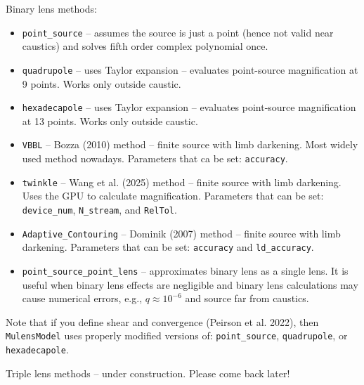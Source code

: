 \documentclass[12pt]{article}
\newcommand\MM{{\tt MulensModel}}
\begin{document}
\bigskip\bigskip
Binary lens methods:
\begin{itemize}
\item {\tt point\_source} -- assumes the source is just a point (hence not valid near caustics) and solves fifth order complex polynomial once.
\item {\tt quadrupole} -- uses Taylor expansion -- evaluates point-source magnification at 9 points.  Works only outside caustic.
\item {\tt hexadecapole} -- uses Taylor expansion -- evaluates point-source magnification at 13 points.  Works only outside caustic.
\item {\tt VBBL} -- Bozza (2010) method -- finite source with limb darkening.  Most widely used method nowadays.  Parameters that ca be set: {\tt accuracy}.
\item {\tt twinkle} -- Wang et al. (2025) method -- finite source with limb darkening. Uses the GPU to calculate magnification. Parameters that can be set: {\tt device\_num}, {\tt N\_stream}, and {\tt RelTol}.
\item {\tt Adaptive\_Contouring} -- Dominik (2007) method -- finite source with limb darkening.  Parameters that can be set: {\tt accuracy} and {\tt ld\_accuracy}.
\item {\tt point\_source\_point\_lens} -- approximates binary lens as a single lens.  It is useful when binary lens effects are negligible and binary lens calculations may cause numerical errors, e.g., $q\approx10^{-6}$ and source far from caustics.  
\end{itemize}
Note that if you define shear and convergence (Peirson et al. 2022), then {\MM} uses properly modified versions of: {\tt point\_source}, {\tt quadrupole}, or {\tt hexadecapole}. 

\bigskip\bigskip
Triple lens methods -- under construction.  Please come back later!
\end{document}
